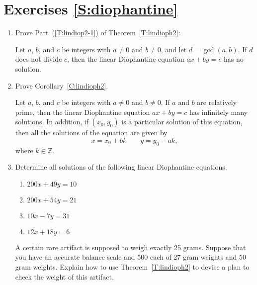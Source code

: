 \section*{Exercises \ref{S:diophantine}}

\begin{enumerate}

\item Prove Part~(\ref{T:lindiop2-1}) of Theorem~\ref{T:lindioph2}: \label{exer:lindioph2}

Let $a$, $b$, and $c$ be integers with $a \ne 0$ and $b \ne 0$, and let 
$d = \gcd( a,b )$.  If $d$ does not divide $c$, then the linear Diophantine equation 
$ax + by = c$ has no solution.



\item Prove Corollary~\ref{C:lindioph2}. \label{exer:cor-lindioph2}

Let $a$, $b$, and $c$ be integers with $a \ne 0$ and $b \ne 0$.  If $a$ and $b$ are relatively prime, then the linear Diophantine equation $ax + by = c$ has infinitely many solutions.  In addition, if  $\left( x_0, y_0 \right)$ is a particular solution of this equation, then all the solutions of the equation are given by
\[
x = x_0 + b k  \qquad y = y_0 - a k\!,
\]
where $k \in \mathbb{Z}$.




\item Determine all solutions of the following linear Diophantine equations. \label{exer:sec83-2}

\begin{multicols}{2}
\begin{enumerate}
  \yitem $9x + 14y = 1$

  \yitem $18x + 22y = 4$

  \yitem $48x - 18y = 15$

  \yitem $12x + 9y = 6$

  \item $200x + 49y = 10$

  \item $200x + 54y = 21$

  \item $10x - 7y = 31$

  \item $12x + 18y = 6$

\end{enumerate}
\end{multicols}


\xitem   A certain rare artifact is supposed to weigh exactly 25 grams.  Suppose that you have an accurate balance scale and 500 each of 27 gram weights and  50 gram weights.  Explain how to use Theorem~\ref{T:lindioph2} to devise a plan to check the weight of this artifact.  
\label{exer:balancing}%


\end{enumerate}
